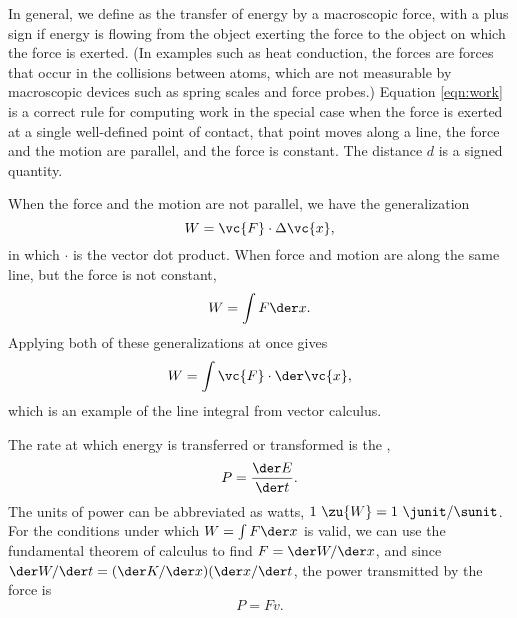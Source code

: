 In general, we define  as the transfer of energy by a macroscopic force, with a plus sign if energy
is flowing from the object exerting the force to the object on which the force is exerted.
(In examples such as heat conduction, the forces are forces that occur in the collisions between atoms,
which are not measurable by macroscopic devices such as spring scales and force probes.)
Equation \eqref{eqn:work} is a correct rule for computing work in the special case when the force is
exerted at a single well-defined point of contact, that point moves along a line, the force and the
motion are parallel, and the force is constant. The distance $d$ is a signed quantity.

When the force and the motion are not parallel, we have the generalization
\begin{equation}
  W = \vc{F}\cdot\Delta \vc{x},
\end{equation}
in which $\cdot$ is the vector dot product. When force and motion are along the same line,
but the force is not constant,
\begin{equation}
  W = \int F \der x.
\end{equation}
Applying both of these generalizations at once gives
\begin{equation}
  W = \int \vc{F} \cdot \der \vc{x},
\end{equation}
which is an example of the line integral from vector calculus.

The rate at which energy is transferred or transformed is the ,
\begin{equation}
  P = \frac{\der E}{\der t}.
\end{equation}
The units of power can be abbreviated as watts, $1\ \zu{W}=1\ \junit/\sunit$.
For the conditions under which $W = \int F \der x$ is valid, we can use the
fundamental theorem of calculus to find $F=\der W/\der x$, and since
$\der W/\der t=(\der K/\der x)(\der x/\der t$, the power transmitted by the
force is
\begin{equation}
  P = Fv.
\end{equation}
